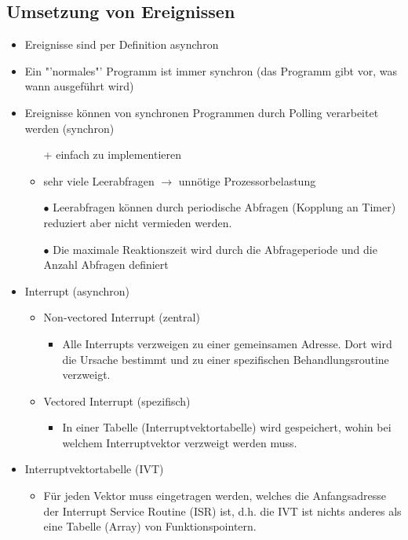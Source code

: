 \subsection{Umsetzung von Ereignissen}
\begin{itemize}
	\item Ereignisse sind per Definition asynchron
	\item Ein "'normales"' Programm ist immer synchron (das Programm gibt vor, was wann ausgeführt wird)
	\item Ereignisse können von synchronen Programmen durch Polling verarbeitet werden (synchron)
	      \begin{itemize}
		      \item[+] einfach zu implementieren
		      \item sehr viele Leerabfragen $\rightarrow$ unnötige Prozessorbelastung
		      \item[$\bullet$] Leerabfragen können durch periodische Abfragen (Kopplung an Timer) reduziert aber nicht vermieden werden.
		      \item[$\bullet$] Die maximale Reaktionszeit wird durch die Abfrageperiode und die Anzahl Abfragen definiert
	      \end{itemize}
	\item Interrupt (asynchron)
	      \begin{itemize}
		      \item Non-vectored Interrupt (zentral)
		            \begin{itemize}
			            \item Alle Interrupts verzweigen zu einer gemeinsamen Adresse. Dort wird die Ursache bestimmt und zu einer spezifischen Behandlungsroutine verzweigt.
		            \end{itemize}
		      \item Vectored Interrupt (spezifisch)
		            \begin{itemize}
			            \item In einer Tabelle (Interruptvektortabelle) wird gespeichert, wohin bei welchem Interruptvektor verzweigt werden muss.
		            \end{itemize}
	      \end{itemize}
	\item	Interruptvektortabelle (IVT)
	      \begin{itemize}
		      \item Für jeden Vektor muss eingetragen werden, welches die Anfangsadresse der Interrupt Service Routine (ISR) ist, d.h. die IVT ist nichts anderes als eine Tabelle (Array) von Funktionspointern.
	      \end{itemize}
\end{itemize}

